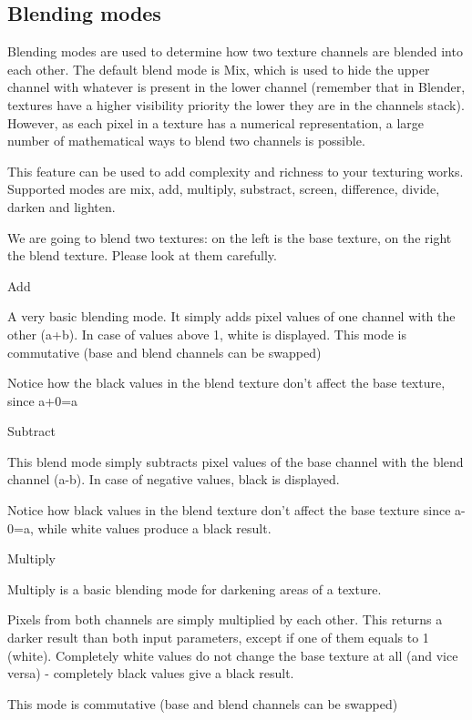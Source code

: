 \subsection{Blending modes}

Blending modes are used to determine how two texture channels are blended into each other. The default blend mode is Mix, which is used to hide the upper channel with whatever is present in the lower channel (remember that in Blender, textures have a higher visibility priority the lower they are in the channels stack). However, as each pixel in a texture has a numerical representation, a large number of mathematical ways to blend two channels is possible.

This feature can be used to add complexity and richness to your texturing works. Supported modes are mix, add, multiply, substract, screen, difference, divide, darken and lighten.


We are going to blend two textures: on the left is the base texture, on the right the blend texture. Please look at them carefully.


   

Add

A very basic blending mode. It simply adds pixel values of one channel with the other (a+b). In case of values above 1, white is displayed. This mode is commutative (base and blend channels can be swapped)

Notice how the black values in the blend texture don't affect the base texture, since a+0=a

Subtract

This blend mode simply subtracts pixel values of the base channel with the blend channel (a-b). In case of negative values, black is displayed.

Notice how black values in the blend texture don't affect the base texture since a-0=a, while white values produce a black result.

Multiply

Multiply is a basic blending mode for darkening areas of a texture.

Pixels from both channels are simply multiplied by each other. This returns a darker result than both input parameters, except if one of them equals to 1 (white). Completely white values do not change the base texture at all (and vice versa) - completely black values give a black result.

This mode is commutative (base and blend channels can be swapped)

